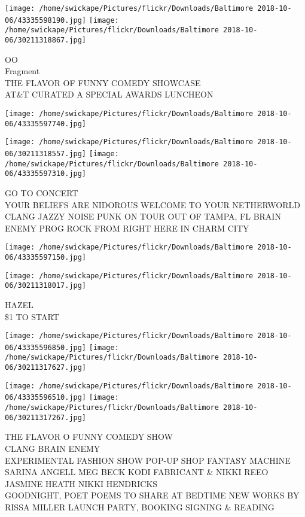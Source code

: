 \documentclass[10pt,letterpaper]{article}
\begin{document}
\texttt{[image: /home/swickape/Pictures/flickr/Downloads/Baltimore 2018-10-06/43335598190.jpg]}
\texttt{[image: /home/swickape/Pictures/flickr/Downloads/Baltimore 2018-10-06/30211318867.jpg]}

OO\\
Fragment\\
THE FLAVOR OF FUNNY COMEDY SHOWCASE\\
AT\&T CURATED A SPECIAL AWARDS LUNCHEON\\
\pagebreak

\texttt{[image: /home/swickape/Pictures/flickr/Downloads/Baltimore 2018-10-06/43335597740.jpg]}

\vspace{0.25in}
\texttt{[image: /home/swickape/Pictures/flickr/Downloads/Baltimore 2018-10-06/30211318557.jpg]}
\texttt{[image: /home/swickape/Pictures/flickr/Downloads/Baltimore 2018-10-06/43335597310.jpg]}

GO TO CONCERT\\
YOUR BELIEFS ARE NIDOROUS WELCOME TO YOUR NETHERWORLD\\
CLANG JAZZY NOISE PUNK ON TOUR OUT OF TAMPA, FL BRAIN ENEMY PROG ROCK FROM RIGHT HERE IN CHARM CITY\\
\pagebreak

\texttt{[image: /home/swickape/Pictures/flickr/Downloads/Baltimore 2018-10-06/43335597150.jpg]}

\vspace{0.25in}
\texttt{[image: /home/swickape/Pictures/flickr/Downloads/Baltimore 2018-10-06/30211318017.jpg]}

HAZEL\\
\$1 TO START\\
\pagebreak

\texttt{[image: /home/swickape/Pictures/flickr/Downloads/Baltimore 2018-10-06/43335596850.jpg]}
\texttt{[image: /home/swickape/Pictures/flickr/Downloads/Baltimore 2018-10-06/30211317627.jpg]}

\texttt{[image: /home/swickape/Pictures/flickr/Downloads/Baltimore 2018-10-06/43335596510.jpg]}
\texttt{[image: /home/swickape/Pictures/flickr/Downloads/Baltimore 2018-10-06/30211317267.jpg]}

THE FLAVOR O FUNNY COMEDY SHOW\\
CLANG BRAIN ENEMY\\
EXPERIMENTAL FASHION SHOW POP{-}UP SHOP FANTASY MACHINE SARINA ANGELL MEG BECK KODI FABRICANT \& NIKKI  REEO JASMINE HEATH NIKKI HENDRICKS\\
GOODNIGHT, POET POEMS TO SHARE AT BEDTIME NEW WORKS BY RISSA MILLER LAUNCH PARTY, BOOKING SIGNING \& READING\\
\pagebreak
\end{document}
